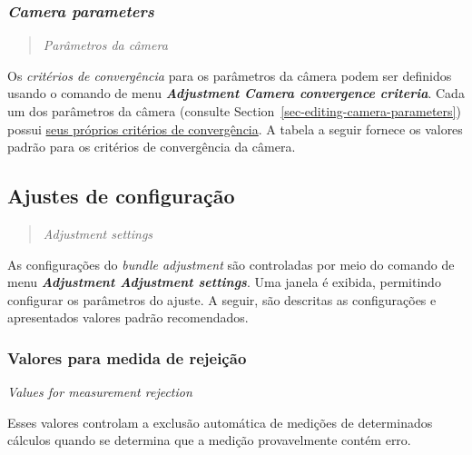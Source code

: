 \documentclass[
  12pt,
  letterpaper,
  DIV=11,
  numbers=noendperiod]{scrreprt}
\begin{document}
\subsubsection{\texorpdfstring{\emph{Camera
parameters}}{Camera parameters}}\label{camera-parameters}

\begin{quote}
\emph{Parâmetros da câmera}
\end{quote}

Os \emph{critérios de convergência} para os parâmetros da câmera podem
ser definidos usando o comando de menu \textbf{\emph{Adjustment
\textbar{} Camera convergence criteria}}. Cada um dos parâmetros da
câmera (consulte Section~\ref{sec-editing-camera-parameters}) possui
\ul{seus próprios critérios de convergência}. A tabela a seguir fornece
os valores padrão para os critérios de convergência da câmera.

\subsection{Ajustes de
configuração}\label{ajustes-de-configurauxe7uxe3o}

\begin{quote}
\emph{Adjustment settings}
\end{quote}

As configurações do \emph{bundle adjustment} são controladas por meio do
comando de menu \textbf{\emph{Adjustment \textbar{} Adjustment
settings}}. Uma janela é exibida, permitindo configurar os parâmetros do
ajuste. A seguir, são descritas as configurações e apresentados valores
padrão recomendados.

\subsubsection{Valores para medida de
rejeição}\label{valores-para-medida-de-rejeiuxe7uxe3o}

\emph{Values for measurement rejection}

Esses valores controlam a exclusão automática de medições de
determinados cálculos quando se determina que a medição provavelmente
contém erro.
\end{document}
